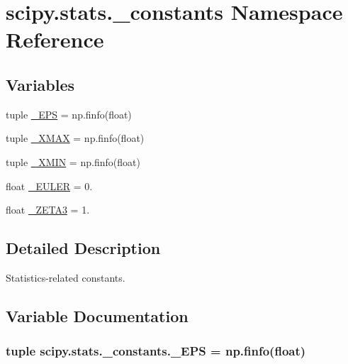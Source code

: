 \hypertarget{namespacescipy_1_1stats_1_1__constants}{}\section{scipy.\+stats.\+\_\+constants Namespace Reference}
\label{namespacescipy_1_1stats_1_1__constants}
\subsection*{Variables}
\begin{DoxyCompactItemize}
\item 
tuple \hyperlink{namespacescipy_1_1stats_1_1__constants_a0a3f7f6032c793e5e3ee1035b61a7632}{\+\_\+\+E\+P\+S} = np.\+finfo(float)
\item 
tuple \hyperlink{namespacescipy_1_1stats_1_1__constants_a9534890a2546243188fa5364ec8cb933}{\+\_\+\+X\+M\+A\+X} = np.\+finfo(float)
\item 
tuple \hyperlink{namespacescipy_1_1stats_1_1__constants_a45bf773f20d566c55860c7c8e8857510}{\+\_\+\+X\+M\+I\+N} = np.\+finfo(float)
\item 
float \hyperlink{namespacescipy_1_1stats_1_1__constants_a6101911fa3dc4592490f698ee136fa1e}{\+\_\+\+E\+U\+L\+E\+R} = 0.
\item 
float \hyperlink{namespacescipy_1_1stats_1_1__constants_a94ff88a600ef4c781e07cf14e11049b2}{\+\_\+\+Z\+E\+T\+A3} = 1.
\end{DoxyCompactItemize}


\subsection{Detailed Description}
\begin{DoxyVerb}Statistics-related constants.\end{DoxyVerb}
 

\subsection{Variable Documentation}
\hypertarget{namespacescipy_1_1stats_1_1__constants_a0a3f7f6032c793e5e3ee1035b61a7632}{}
\subsubsection[{\+\_\+\+E\+P\+S}]{\setlength{\rightskip}{0pt plus 5cm}tuple scipy.\+stats.\+\_\+constants.\+\_\+\+E\+P\+S = np.\+finfo(float)}\label{namespacescipy_1_1stats_1_1__constants_a0a3f7f6032c793e5e3ee1035b61a7632}
\hypertarget{namespacescipy_1_1stats_1_1__constants_a6101911fa3dc4592490f698ee136fa1e}{}
